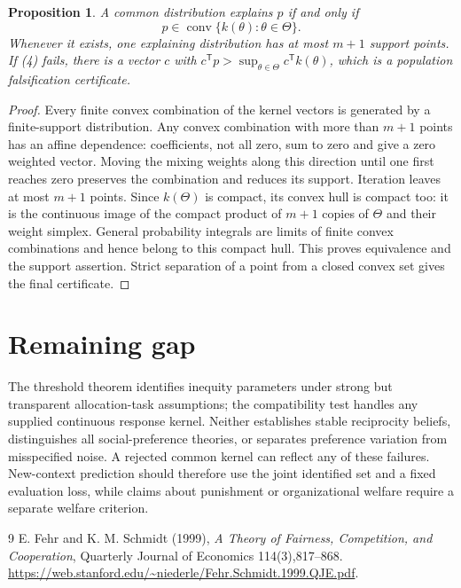 \documentclass[11pt]{article}
\newtheorem{proposition}[theorem]{Proposition}
\theoremstyle{definition}
\begin{document}
\begin{proposition}
A common distribution explains $p$ if and only if
\[
 p\in\operatorname{conv}\{k(\theta):\theta\in\Theta\}.     \tag{4}
\]
Whenever it exists, one explaining distribution has at most $m+1$
support points. If (4) fails, there is a vector $c$ with
$c^{\mathsf T}p>\sup_{\theta\in\Theta}c^{\mathsf T}k(\theta)$,
which is a population falsification certificate.
\end{proposition}
\begin{proof}
Every finite convex combination of the kernel vectors is generated by
a finite-support distribution. Any convex combination with more than
$m+1$ points has an affine dependence: coefficients, not all zero,
sum to zero and give a zero weighted vector. Moving the mixing weights
along this direction until one first reaches zero preserves the
combination and reduces its support. Iteration leaves at most $m+1$
points. Since $k(\Theta)$ is compact, its convex hull is compact too:
it is the continuous image of the compact product of $m+1$ copies of
$\Theta$ and their weight simplex. General probability integrals are
limits of finite convex combinations and hence belong to this compact
hull. This proves equivalence and the support assertion. Strict separation
of a point from a closed convex set gives the final certificate.
\end{proof}

\section*{Remaining gap}
The threshold theorem identifies inequity parameters under strong but
transparent allocation-task assumptions; the compatibility test handles
any supplied continuous response kernel. Neither establishes stable
reciprocity beliefs, distinguishes all social-preference theories, or
separates preference variation from misspecified noise. A rejected common
kernel can reflect any of these failures. New-context prediction should
therefore use the joint identified set and a fixed evaluation loss, while
claims about punishment or organizational welfare require a separate
welfare criterion.
\begin{thebibliography}{9}
 E. Fehr and K. M. Schmidt (1999), \emph{A Theory of
Fairness, Competition, and Cooperation}, Quarterly Journal of Economics
114(3),817--868.
\url{https://web.stanford.edu/~niederle/Fehr.Schmidt.1999.QJE.pdf}.
\end{thebibliography}
\end{document}
